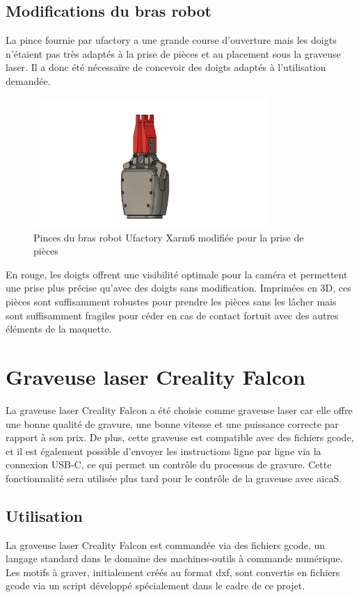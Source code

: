\subsection{Modifications du bras robot}
La pince fournie par \gls{ufactory} a une grande course d'ouverture mais les doigts n'étaient pas très adaptés à la prise de pièces et au placement sous la graveuse laser. Il a donc été nécessaire de concevoir des doigts adaptés à l'utilisation demandée.
\begin{figure}[H]
    \centering
    \includegraphics[width=0.8\textwidth]{assets/figures/Pince_Xarm6.png}
    \caption{Pinces du bras robot Ufactory Xarm6 modifiée pour la prise de pièces}
    \label{fig:pince_robot}
\end{figure}

En rouge, les doigts offrent une visibilité optimale pour la caméra et permettent une prise plus précise qu'avec des doigts sans modification. Imprimées en 3D, ces pièces sont suffisamment robustes pour prendre les pièces sans les lâcher mais sont suffisamment fragiles pour céder en cas de contact fortuit avec des autres éléments de la maquette.

\section{Graveuse laser Creality Falcon}

La graveuse laser Creality Falcon a été choisie comme graveuse laser car elle offre une bonne qualité de gravure, une bonne vitesse et une puissance correcte par rapport à son prix. De plus, cette graveuse est compatible avec des fichiers \gls{gcode}, et il est également possible d'envoyer les instructions ligne par ligne via la connexion USB-C, ce qui permet un contrôle du processus de gravure. Cette fonctionnalité sera utilisée plus tard pour le contrôle de la graveuse avec \gls{aicaS}.

\subsection{Utilisation}
La graveuse laser Creality Falcon est commandée via des fichiers \gls{gcode}, un langage standard dans le domaine des machines-outils à commande numérique. Les motifs à graver, initialement créés au format \gls{dxf}, sont convertis en fichiers \gls{gcode} via un script développé spécialement dans le cadre de ce projet.

